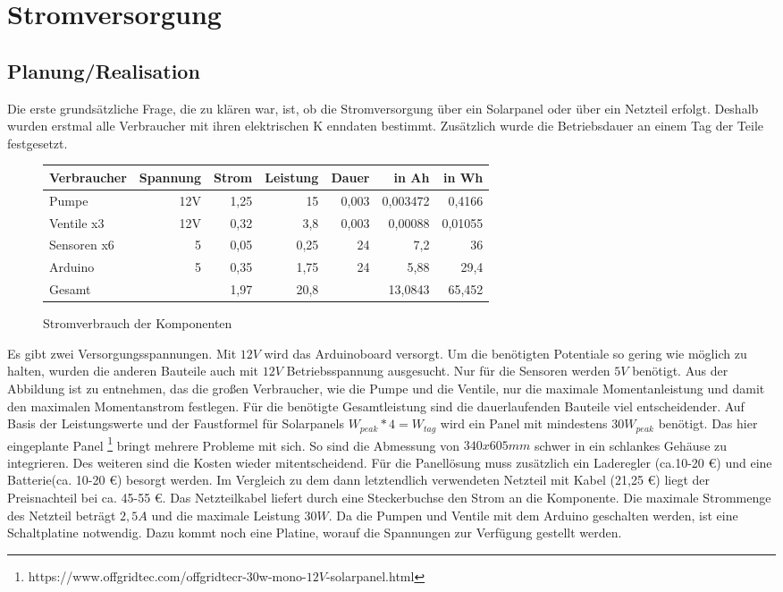 \section{Stromversorgung}

\subsection{Planung/Realisation}
Die erste grundsätzliche Frage, die zu klären war, ist, ob die Stromversorgung über ein Solarpanel
oder über ein Netzteil erfolgt. Deshalb wurden erstmal alle Verbraucher mit ihren elektrischen K
enndaten bestimmt. Zusätzlich wurde
die Betriebsdauer an einem Tag der Teile festgesetzt.


\begin{figure}[ht]
    \centering
    \begin{tabular}{|l|r|r|r|r|r|r|}
        \hline
        Verbraucher & Spannung & Strom & Leistung & Dauer & in Ah & in Wh \\\hline\hline
        Pumpe & 12V & 1,25 & 15 & 0,003 & 0,003472 & 0,4166 \\\hline
        Ventile x3 & 12V & 0,32 & 3,8 & 0,003 & 0,00088 & 0,01055 \\\hline
        Sensoren x6 & 5 & 0,05 & 0,25 & 24 & 7,2 & 36 \\\hline
        Arduino & 5 & 0,35 & 1,75 & 24 & 5,88 & 29,4 \\\hline
        Gesamt &  & 1,97 & 20,8 &  & 13,0843 & 65,452 \\\hline
    \end{tabular}
    \caption{Stromverbrauch der Komponenten}
\end{figure}

Es gibt zwei Versorgungsspannungen.
Mit $12V$ wird das Arduinoboard versorgt. Um die benötigten Potentiale so gering wie
möglich zu halten, wurden die anderen Bauteile auch mit $12V$
Betriebsspannung ausgesucht. Nur für die Sensoren werden $5V$ benötigt.
Aus der Abbildung ist zu entnehmen, das die großen Verbraucher, wie die Pumpe und die Ventile,
nur die maximale Momentanleistung und damit den maximalen Momentanstrom festlegen. Für die
benötigte Gesamtleistung sind die dauerlaufenden Bauteile viel entscheidender.
Auf Basis der Leistungswerte und der Faustformel für
Solarpanels $W_{peak} * 4 = W_{tag}$ wird ein Panel mit mindestens $30W_{peak}$ benötigt. Das
hier eingeplante Panel \footnote{https://www.offgridtec.com/offgridtecr-30w-mono-$12V$-solarpanel.html}
bringt mehrere Probleme mit sich. So sind die
Abmessung von $340x605mm$ schwer in ein schlankes Gehäuse zu integrieren. Des weiteren sind die
Kosten wieder mitentscheidend. Für die Panellösung
muss zusätzlich ein Laderegler (ca.10-20 \euro{}) und eine Batterie(ca. 10-20 \euro{}) besorgt werden.
Im Vergleich zu dem dann letztendlich verwendeten Netzteil mit Kabel (21,25 \euro{}) liegt der
Preisnachteil bei ca. 45-55 \euro{}. Das Netzteilkabel liefert
durch eine Steckerbuchse den Strom an die Komponente. Die maximale Strommenge des Netzteil beträgt
$2,5 A$ und die maximale Leistung $30W$.
Da die Pumpen und Ventile mit dem Arduino geschalten werden, ist eine Schaltplatine notwendig.
Dazu kommt noch eine Platine, worauf die Spannungen zur Verfügung gestellt werden.

